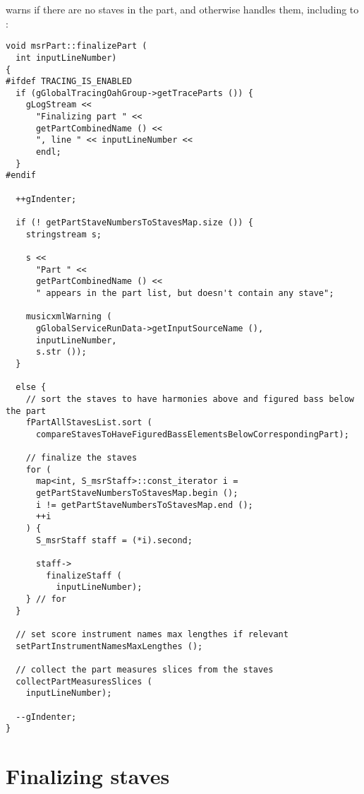  warns if there are no staves in the part, and otherwise handles them, including \cascading to :
\begin{lstlisting}[language=CPlusPlus]
void msrPart::finalizePart (
  int inputLineNumber)
{
#ifdef TRACING_IS_ENABLED
  if (gGlobalTracingOahGroup->getTraceParts ()) {
    gLogStream <<
      "Finalizing part " <<
      getPartCombinedName () <<
      ", line " << inputLineNumber <<
      endl;
  }
#endif

  ++gIndenter;

  if (! getPartStaveNumbersToStavesMap.size ()) {
    stringstream s;

    s <<
      "Part " <<
      getPartCombinedName () <<
      " appears in the part list, but doesn't contain any stave";

    musicxmlWarning (
      gGlobalServiceRunData->getInputSourceName (),
      inputLineNumber,
      s.str ());
  }

  else {
    // sort the staves to have harmonies above and figured bass below the part
    fPartAllStavesList.sort (
      compareStavesToHaveFiguredBassElementsBelowCorrespondingPart);

    // finalize the staves
    for (
      map<int, S_msrStaff>::const_iterator i =
      getPartStaveNumbersToStavesMap.begin ();
      i != getPartStaveNumbersToStavesMap.end ();
      ++i
    ) {
      S_msrStaff staff = (*i).second;

      staff->
        finalizeStaff (
          inputLineNumber);
    } // for
  }

  // set score instrument names max lengthes if relevant
  setPartInstrumentNamesMaxLengthes ();

  // collect the part measures slices from the staves
  collectPartMeasuresSlices (
    inputLineNumber);

  --gIndenter;
}
\end{lstlisting}



\section{Finalizing staves}

